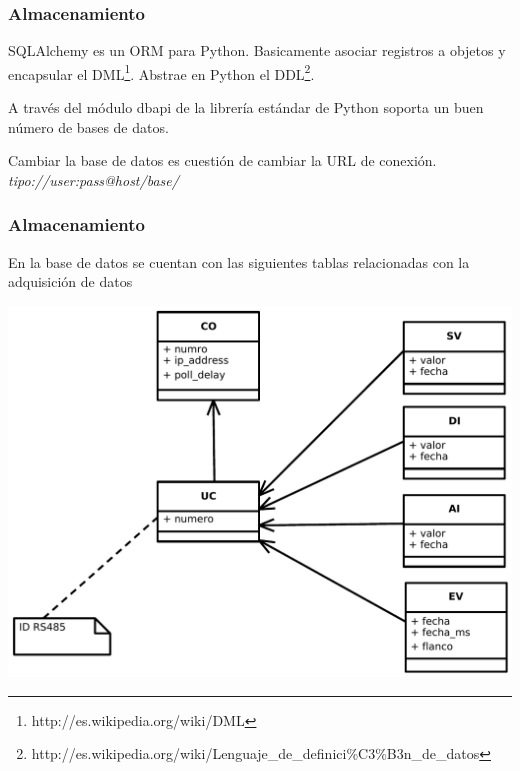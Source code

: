 \documentclass{beamer}
\begin{document}
\begin{frame}
 \frametitle{Almacenamiento}
  SQLAlchemy es un ORM para Python. Basicamente asociar registros 
  a objetos y encapsular el DML\footnote{http://es.wikipedia.org/wiki/DML}.
  Abstrae en Python el DDL\footnote{http://es.wikipedia.org/wiki/Lenguaje\_de\_definici\%C3\%B3n\_de\_datos}.
  
  A través del módulo dbapi de la librería estándar de Python soporta un buen número de bases de datos.

  Cambiar la base de datos es cuestión de cambiar la URL de conexión.
  \emph{tipo://user:pass@host/base/}

  
\end{frame}


\begin{frame}
  \frametitle{Almacenamiento}
  En la base de datos se cuentan con las siguientes tablas relacionadas con la adquisición de datos
  \begin{center}
   \includegraphics[scale=0.45]{modelo_db_basico.pdf}
  \end{center}
\end{frame}
\end{document}
